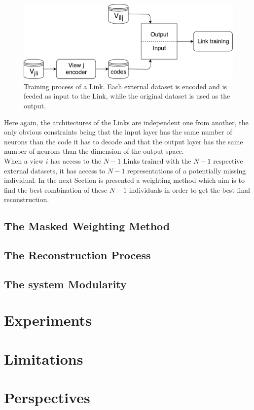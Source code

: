 \documentclass[a4paper]{report}
\begin{document}
    \begin{figure}[h]
        \centering
        \includegraphics[scale=.5]{links}
        \caption{Training process of a Link. Each external dataset is encoded and is feeded as input to the Link, while the original dataset is used as the output.}
\label{fig:crs_link}
    \end{figure}

    Here again, the architectures of the Links are independent one from another, the only obvious constraints being that the input layer has the same number of neurons than the code it has to decode and that the output layer has the same number of neurons than the dimension of the output space.\\

    When a view $i$ has access to the $N-1$ Links trained with the $N-1$ respective external datasets, it has access to $N-1$ representations of a potentially missing individual. In the next Section is presented a weighting method which aim is to find the best combination of these $N-1$ individuals in order to get the best final reconstruction.

    \subsection{The Masked Weighting Method}

    \subsection{The Reconstruction Process}

    \subsection{The system Modularity}

\label{sec:crs_link}

\section{Experiments}
\label{sec:exp}

\section{Limitations}
\label{sec:limit}

\section{Perspectives}
\label{sec:perspectives}



    
    
\end{document}
